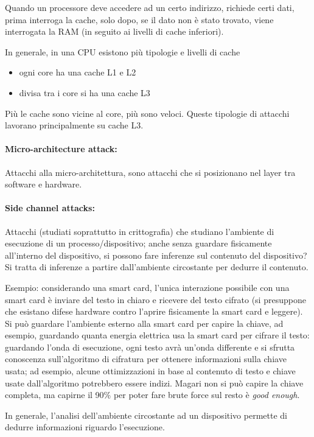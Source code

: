 Quando un processore deve accedere ad un certo indirizzo, richiede certi dati, prima interroga la cache, solo dopo, se il dato non è stato trovato, viene interrogata la RAM (in seguito ai livelli di cache inferiori).

In generale, in una CPU esistono più tipologie e livelli di cache 
\begin{itemize}
	\item ogni core ha una cache L1 e L2
	
    \item divisa tra i core si ha una cache L3
\end{itemize}
Più le cache sono vicine al core, più sono veloci. Queste tipologie di attacchi lavorano principalmente su cache L3. 

\paragraph{Micro-architecture attack:} Attacchi alla micro-architettura, sono attacchi che si posizionano nel layer tra software e hardware. 

\paragraph{Side channel attacks:} Attacchi (studiati soprattutto in crittografia) che studiano l'ambiente di esecuzione di un processo/dispositivo; anche senza guardare fisicamente all'interno del dispositivo, si possono fare inferenze sul contenuto del dispositivo? Si tratta di inferenze a partire dall'ambiente circostante per dedurre il contenuto.

Esempio: considerando una smart card, l'unica interazione possibile con una smart card è inviare del testo in chiaro e ricevere del testo cifrato (si presuppone che esistano difese hardware contro l'aprire fisicamente la smart card e leggere). Si può guardare l'ambiente esterno alla smart card per capire la chiave, ad esempio, guardando quanta energia elettrica usa la smart card per cifrare il testo: guardando l'onda di esecuzione, ogni testo avrà un'onda differente e si sfrutta conoscenza sull'algoritmo di cifratura per ottenere informazioni sulla chiave usata; ad esempio, alcune ottimizzazioni in base al contenuto di testo e chiave usate dall'algoritmo potrebbero essere indizi. Magari non si può capire la chiave completa, ma capirne il 90\% per poter fare brute force sul resto è \textit{good enough}.

In generale, l'analisi dell'ambiente circostante ad un dispositivo permette di dedurre informazioni riguardo l'esecuzione.

